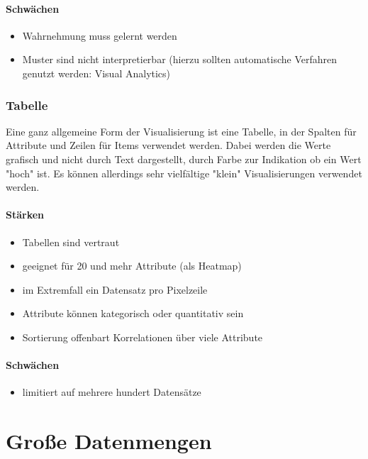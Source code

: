 				\paragraph{Schwächen}
				\begin{itemize}
					\item Wahrnehmung muss gelernt werden
					\item Muster sind nicht interpretierbar (hierzu sollten automatische Verfahren genutzt werden: Visual Analytics)
				\end{itemize}

			\subsubsection{Tabelle}
				Eine ganz allgemeine Form der Visualisierung ist eine Tabelle, in der Spalten für Attribute und Zeilen für Items verwendet werden. Dabei werden die Werte grafisch und nicht durch Text dargestellt, \bspw durch Farbe zur Indikation ob ein Wert "hoch" ist. Es können allerdings sehr vielfältige "klein" Visualisierungen verwendet werden.

				\paragraph{Stärken}
				\begin{itemize}
					\item Tabellen sind vertraut
					\item geeignet für 20 und mehr Attribute (als Heatmap)
					\item im Extremfall ein Datensatz pro Pixelzeile
					\item Attribute können kategorisch oder quantitativ sein
					\item Sortierung offenbart Korrelationen über viele Attribute
				\end{itemize}

				\paragraph{Schwächen}
				\begin{itemize}
					\item limitiert auf mehrere hundert Datensätze
				\end{itemize}

	\section{Große Datenmengen}
		\label{sec:bigdata}

